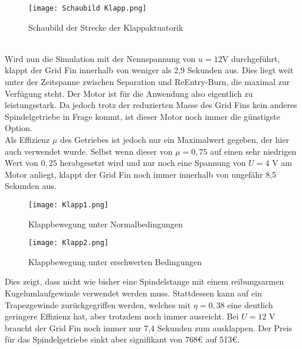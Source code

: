 \begin{figure}[h] 
	\centering
	\texttt{[image: Schaubild Klapp.png]}
	\caption{Schaubild der Strecke der Klappaktuatorik}
\end{figure}\\
Wird nun die Simulation mit der Nennspannung von $u = 12$V durchgeführt, klappt der Grid Fin innerhalb von weniger als 2,9 Sekunden aus. Dies liegt weit unter der Zeitspanne zwischen Separation und ReEntry-Burn, die maximal zur Verfügung steht. Der Motor ist für die Anwendung also eigentlich zu leistungsstark. Da jedoch trotz der reduzierten Masse des Grid Fins kein anderes Spindelgetriebe in Frage kommt, ist dieser Motor noch immer die günstigste Option.
\\
Als Effizienz $\mu$ des Getriebes ist jedoch nur ein Maximalwert gegeben, der hier auch verwendet wurde. Selbst wenn dieser von $\mu = 0,75$ auf einen sehr niedrigen Wert von $0,25$ herabgesetzt wird und nur noch eine Spannung von $U = 4$ V am Motor anliegt, klappt der Grid Fin noch immer innerhalb von ungefähr 8,5 Sekunden aus.
\begin{figure}[h] 
	\centering
	\texttt{[image: Klapp1.png]}
	\caption{Klappbewegung unter Normalbedingungen}
\end{figure}
\begin{figure}[h] 
	\centering
	\texttt{[image: Klapp2.png]}
	\caption{Klappbewegung unter erschwerten Bedingungen}
\end{figure}
Dies zeigt, dass nicht wie bisher eine Spindelstange mit einem reibungsarmen Kugelumlaufgewinde verwendet werden muss. Stattdessen kann auf ein Trapezgewinde zurückgegriffen werden, welches mit $\eta  = 0,38$ eine deutlich geringere Effizienz hat, aber trotzdem noch immer ausreicht. Bei $U = 12$ V braucht der Grid Fin noch immer nur 7,4 Sekunden zum ausklappen. Der Preis für das Spindelgetriebe sinkt aber signifikant von 768€ auf 513€.

